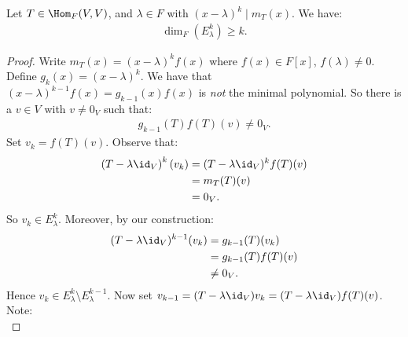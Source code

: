     \begin{theorem}
        Let $T \in \Hom_F{(V,V)}$, and $\lambda \in F$ with $(x-\lambda)^k \mid m_T(x)$. We have:
            \begin{equation*}
            \begin{split}
                \dim_F(E_\lambda^k) \geq k.
            \end{split}
            \end{equation*}
    \end{theorem}
        \begin{proof}
            Write $m_T(x) = (x-\lambda)^k f(x)$ where $f(x) \in F[x]$, $f(\lambda) \neq 0$. Define $g_k(x) = (x-\lambda)^k$. We have that $(x-\lambda)^{k-1}f(x) = g_{k-1}(x)f(x)$ is \textit{not} the minimal polynomial. So there is a $v \in V$ with $v \neq 0_V$ such that:
                \begin{equation*}
                \begin{split}
                    g_{k-1}(T)f(T)(v) \neq 0_V.
                \end{split}
                \end{equation*}
            Set $v_k = f(T)(v)$. Observe that:
                \begin{equation*}
                \begin{split}
                    \left(T - \lambda \id_V\right)^k (v_k)
                    & = (T-\lambda \id_V)^k f(T)(v)\\
                    & = m_T(T)(v) \\
                    & = 0_V.
                \end{split}
                \end{equation*}
            So $v_k \in E_\lambda^k$. Moreover, by our construction:
                \begin{equation*}
                \begin{split}
                    (T-\lambda \id_V)^{k-1}(v_k)
                    & = g_{k-1}(T)(v_k) \\
                    & = g_{k-1}(T)f(T)(v) \\
                    & \neq 0_V.
                \end{split}
                \end{equation*}
            Hence $v_k \in E_\lambda^{k} \setminus E_\lambda^{k-1}$. Now set $v_{k-1} = (T - \lambda \id_V)v_k = (T - \lambda \id_V)f(T)(v)$. Note:
                \begin{equation*}

\end{equation*}
\end{proof}
